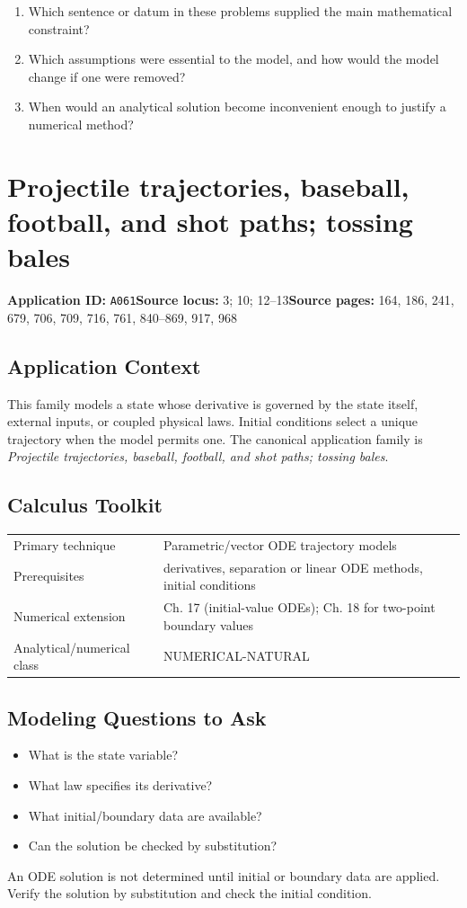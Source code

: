 \documentclass[11pt]{book}
\newcommand{\pid}[1]{\texttt{#1}}
\begin{document}
\begin{reflectionbox}\begin{enumerate}
\item Which sentence or datum in these problems supplied the main mathematical constraint?
\item Which assumptions were essential to the model, and how would the model change if one were removed?
\item When would an analytical solution become inconvenient enough to justify a numerical method?
\end{enumerate}\end{reflectionbox}
\chapter{Projectile trajectories, baseball, football, and shot paths; tossing bales}\label{app:A061}
\textbf{Application ID:} \pid{A061}\quad \textbf{Source locus:} 3; 10; 12–13\quad \textbf{Source pages:} 164, 186, 241, 679, 706, 709, 716, 761, 840–869, 917, 968
\section*{Application Context}
This family models a state whose derivative is governed by the state itself, external inputs, or coupled physical laws. Initial conditions select a unique trajectory when the model permits one. The canonical application family is \emph{Projectile trajectories, baseball, football, and shot paths; tossing bales}.
\section*{Calculus Toolkit}
\begin{tabularx}{\textwidth}{@{}lX@{}}\toprule
Primary technique & Parametric/vector ODE trajectory models \\
Prerequisites & derivatives, separation or linear ODE methods, initial conditions \\
Numerical extension & Ch. 17 (initial-value ODEs); Ch. 18 for two-point boundary values \\
Analytical/numerical class & NUMERICAL-NATURAL \\
\bottomrule\end{tabularx}
\section*{Modeling Questions to Ask}\begin{itemize}
\item What is the state variable?
\item What law specifies its derivative?
\item What initial/boundary data are available?
\item Can the solution be checked by substitution?
\end{itemize}
\begin{errorbox}An ODE solution is not determined until initial or boundary data are applied. Verify the solution by substitution and check the initial condition.\end{errorbox}
\end{document}
